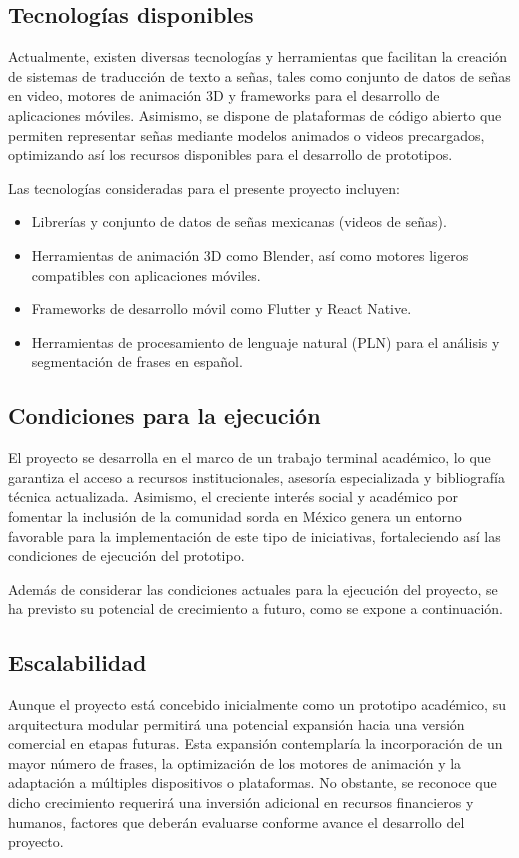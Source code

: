 \subsection{Tecnologías disponibles}
Actualmente, existen diversas tecnologías y herramientas que facilitan la creación de sistemas de traducción de texto a señas, tales como conjunto de datos de señas en video, motores de animación 3D y frameworks para el desarrollo de aplicaciones móviles. Asimismo, se dispone de plataformas de código abierto que permiten representar señas mediante modelos animados o videos precargados, optimizando así los recursos disponibles para el desarrollo de prototipos.

Las tecnologías consideradas para el presente proyecto incluyen:
\begin{itemize} \item Librerías y conjunto de datos de señas mexicanas (videos de señas). \item Herramientas de animación 3D como Blender, así como motores ligeros compatibles con aplicaciones móviles. \item Frameworks de desarrollo móvil como Flutter y React Native. \item Herramientas de procesamiento de lenguaje natural (PLN) para el análisis y segmentación de frases en español. \end{itemize}

\subsection{Condiciones para la ejecución}
El proyecto se desarrolla en el marco de un trabajo terminal académico, lo que garantiza el acceso a recursos institucionales, asesoría especializada y bibliografía técnica actualizada. Asimismo, el creciente interés social y académico por fomentar la inclusión de la comunidad sorda en México genera un entorno favorable para la implementación de este tipo de iniciativas, fortaleciendo así las condiciones de ejecución del prototipo.

Además de considerar las condiciones actuales para la ejecución del proyecto, se ha previsto su potencial de crecimiento a futuro, como se expone a continuación.

\subsection{Escalabilidad}
Aunque el proyecto está concebido inicialmente como un prototipo académico, su arquitectura modular permitirá una potencial expansión hacia una versión comercial en etapas futuras. Esta expansión contemplaría la incorporación de un mayor número de frases, la optimización de los motores de animación y la adaptación a múltiples dispositivos o plataformas. No obstante, se reconoce que dicho crecimiento requerirá una inversión adicional en recursos financieros y humanos, factores que deberán evaluarse conforme avance el desarrollo del proyecto.

